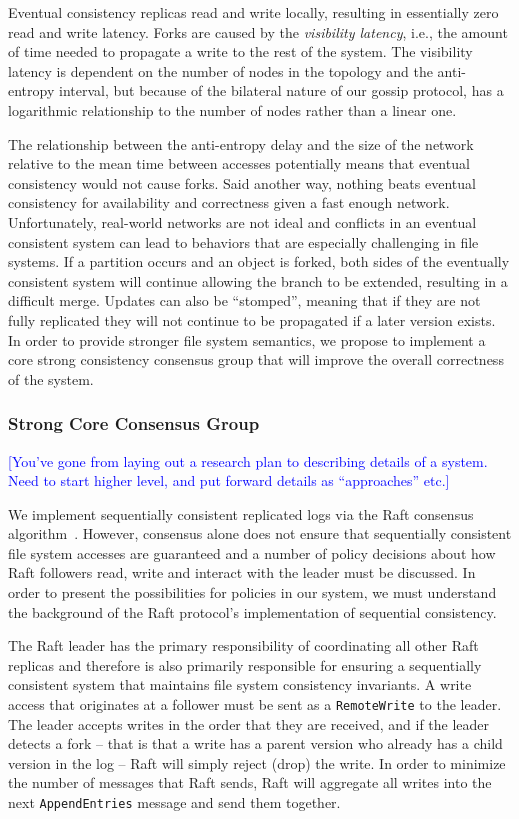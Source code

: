 \documentclass{article}
\newcommand{\pjk}[1]{{\bf
    [\marginpar[\hbox{{\textcolor{blue}{pjk}}\raisebox{0ex}{\Huge $\rightarrow$}}]%
{\hbox{\raisebox{0ex}{\Huge $\leftarrow$}{\textcolor{blue}{pjk}}}}\textcolor{blue}{#1}]}}
\renewcommand{\pjk}[1]{\textcolor{blue}{[#1]}}
\begin{document}
Eventual consistency replicas read and write locally, resulting in essentially zero read and write latency. Forks are caused by the \textit{visibility latency}, i.e., the amount of time needed to propagate a write to the rest of the system. The visibility latency is dependent on the number of nodes in the topology and the anti-entropy interval, but because of the bilateral nature of our gossip protocol, has a logarithmic relationship to the number of nodes rather than a linear one.

The relationship between the anti-entropy delay and the size of the network relative to the mean time between accesses potentially means that eventual consistency would not cause forks. Said another way, nothing beats eventual consistency for availability and correctness given a fast enough network. Unfortunately, real-world networks are not ideal and conflicts in an eventual consistent system can lead to behaviors that are especially challenging in file systems. If a partition occurs and an object is forked, both sides of the eventually consistent system will continue allowing the branch to be extended, resulting in a difficult merge. Updates can also be ``stomped'', meaning that if they are not fully replicated they will not continue to be propagated if a later version exists. In order to provide stronger file system semantics, we propose to implement a core strong consistency consensus group that will improve the overall correctness of the system.

\subsubsection{Strong Core Consensus Group}

\pjk{You've gone from laying out a research plan to describing details of a system. Need to start higher level, and put forward details as ``approaches'' etc.}

We implement sequentially consistent replicated logs via the Raft consensus algorithm~\cite{ongaro_search_2014}. However, consensus alone does not ensure that sequentially consistent file system accesses are guaranteed and a number of policy decisions about how Raft followers read, write and interact with the leader must be discussed. In order to present the possibilities for policies in our system, we must understand the background of the Raft protocol's implementation of sequential consistency.

The Raft leader has the primary responsibility of coordinating all other Raft replicas and therefore is also primarily responsible for ensuring a sequentially consistent system that maintains file system consistency invariants. A write access that originates at a follower must be sent as a \texttt{RemoteWrite} to the leader. The leader accepts writes in the order that they are received, and if the leader detects a fork -- that is that a write has a parent version who already has a child version in the log -- Raft will simply reject (drop) the write. In order to minimize the number of messages that Raft sends, Raft will aggregate all writes into the next \texttt{AppendEntries} message and send them together.
\end{document}
